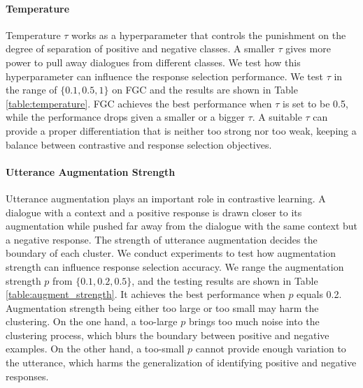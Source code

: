 \documentclass[letterpaper]{article} \usepackage{aaai22}  \usepackage{times}  \usepackage{helvet}  \usepackage{courier}  \usepackage[hyphens]{url}  \usepackage{graphicx} \urlstyle{rm} \def\UrlFont{\rm}  \usepackage{natbib}  \usepackage{caption} \DeclareCaptionStyle{ruled}{labelfont=normalfont,labelsep=colon,strut=off} \frenchspacing  \setlength{\pdfpagewidth}{8.5in}  \setlength{\pdfpageheight}{11in}  \usepackage{algorithm}
\begin{document}
\paragraph{Temperature} Temperature $\tau$ works as a hyperparameter that controls the punishment on the degree of separation of positive and negative classes. A smaller $\tau$ gives more power to pull away dialogues from different classes. We test how this hyperparameter can influence the response selection performance. We test $\tau$ in the range of $\{0.1, 0.5, 1\}$ on FGC and the results are shown in Table \ref{table:temperature}. FGC achieves the best performance when $\tau$ is set to be 0.5, while the performance drops given a smaller or a bigger $\tau$. A suitable $\tau$ can provide a proper differentiation that is neither too strong nor too weak, keeping a balance between contrastive and response selection objectives. 

\begin{table}[htbp]
\centering
{}
\caption{Influence of temperature $\tau$ in FGC.}
\label{table:temperature}
\end{table}

\paragraph{Utterance Augmentation Strength}
Utterance augmentation plays an important role in contrastive learning. A dialogue with a context and a positive response is drawn closer to its augmentation while pushed far away from the dialogue with the same context but a negative response. The strength of utterance augmentation decides the boundary of each cluster. We conduct experiments to test how augmentation strength can influence response selection accuracy. We range the augmentation strength $p$ from $\{0.1, 0.2, 0.5\}$, and the testing results are shown in Table \ref{table:augment_strength}. It achieves the best performance when $p$ equals 0.2. Augmentation strength being either too large or too small may harm the clustering. On the one hand, a too-large $p$ brings too much noise into the clustering process, which blurs the boundary between positive and negative examples. On the other hand, a too-small $p$ cannot provide enough variation to the utterance, which harms the generalization of identifying positive and negative responses.
\end{document}
